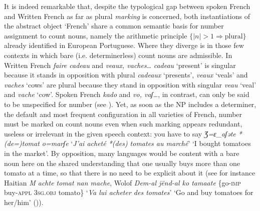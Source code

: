 \documentclass[output=paper]{langscibook}
\begin{document}
\begin{sloppypar}
It is indeed remarkable that, despite the typological gap between spoken French and Written French as far as plural \textit{marking} is concerned, both instantiations of the abstract object ‘French’ share a common semantic basis for number assignment to count nouns, namely the arithmetic principle $\{|n| > 1 \Rightarrow  \text{plural}\}$ already identified in European Portuguese. Where they diverge is in those few contexts in which bare (i.e. determinerless) count nouns are admissible. In Written French \textit{faire cadeau} and \textit{veaux, vaches}… \textit{cadeau} ‘present’ is singular because it stands in opposition with plural \textit{cadeaux} ‘presents’, \textit{veaux} ‘veals’ and \textit{vaches} ‘cows’ are plural because they stand in opposition with singular \textit{veau} ‘veal’ and \textit{vache} ‘cow’. Spoken French \textit{kado} and \textit{vo, vaʃ…}, in contrast, can only be said to be unspecified for number (see ). Yet, as soon as the NP includes a determiner, the default and most frequent configuration in all varieties of French, number must be marked on count nouns even when such marking appears redundant, useless or irrelevant in the given speech context: you have to say \textit{\MakeUppercase{ʒ}}\textit{=ɛ\_aʃəte *(de=)tomat o=marʃe} ‘\textit{J’ai acheté *(des) tomates au marché}’ ‘I bought tomatoes in the market’. By opposition, many languages would be content with a bare noun here on the shared understanding that one usually buys more than one tomato at a time, so that there is no need to be explicit about it (see for instance Haitian \textit{M achte tomat nan mache}, Wolof \textit{Dem-al jënd-al ko tamaate} \{go-\textsc{imp} buy-\textsc{appl} \textsc{3sg.obj} tomato\} ‘\textit{Va lui acheter des tomates}’ ‘Go and buy tomatoes for her/him’ (\citealt[212]{FalEtAl1990})).
\end{sloppypar}
\end{document}
